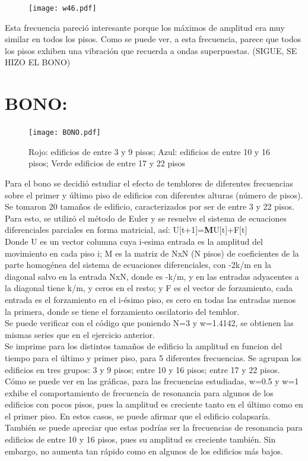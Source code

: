 \documentclass[11pt,letterpaper]{exam}
\begin{document}
\begin{figure}[H]
\centering
\texttt{[image: w46.pdf]}
\end{figure}
Esta frecuencia pareció interesante porque los máximos de amplitud era muy similar en todos los pisos. Como se puede ver, a esta frecuencia, parece que todos los pisos exhiben una vibración que recuerda a ondas superpuestas. (SIGUE, SE HIZO EL BONO)

\section{BONO:}
\begin{figure}[H]
\centering
\texttt{[image: BONO.pdf]}
\caption{Rojo: edificios de entre 3 y 9 pisos; Azul: edificios de entre 10 y 16 pisos; Verde edificios de entre 17 y 22 pisos}
\end{figure}
Para el bono se decidió estudiar el efecto de temblores de diferentes frecuencias sobre el primer y último piso de edificios con diferentes alturas (número de pisos). Se tomaron 20 tamaños de edificio, caracterizados por ser de entre 3 y 22 pisos.\\
Para esto, se utilizó el método de Euler y se resuelve el sistema de ecuaciones diferenciales parciales en forma matricial, así: U[t+1]=\textbf{M}U[t]+F[t]\\
Donde U es un vector columna cuya i-esima entrada es la amplitud del movimiento en cada piso i; M es la matriz de NxN (N pisos) de coeficientes de la parte homogénea del sistema de ecuaciones diferenciales, con -2k/m en la diagonal salvo en la entrada NxN, donde es -k/m, y en las entradas adyacentes a la diagonal tiene k/m, y ceros en el resto; y F es el vector de forzamiento, cada entrada es el forzamiento en el i-ésimo piso, es cero en todas las entradas menos la primera, donde se tiene el forzamiento oscilatorio del temblor. \\
Se puede verificar con el código que poniendo N=3 y w=1.4142, se obtienen las mismas series que en el ejercicio anterior.
\\
Se imprime para los distintos tamaños de edificio la amplitud en funcion del tiempo para el último y primer piso, para 5 diferentes frecuencias. Se agrupan los edificios en tres grupos: 3 y 9 pisos; entre 10 y 16 pisos; entre 17 y 22 pisos. \\
Cómo se puede ver en las gráficas, para las frecuencias estudiadas, w=0.5 y w=1 exhibe el comportamiento de frecuencia de resonancia para algunos de los edificios con pocos pisos, pues la amplitud es creciente tanto en el último como en el primer piso. En estos casos, se puede afirmar que el edificio colapsaría. También se puede apreciar que estas podrías ser la frecuencias de resonancia para edificios de entre 10 y 16 pisos, pues su amplitud es creciente también. Sin embargo, no aumenta tan rápido como en algunos de los edificios más bajos.\\
\end{document}

